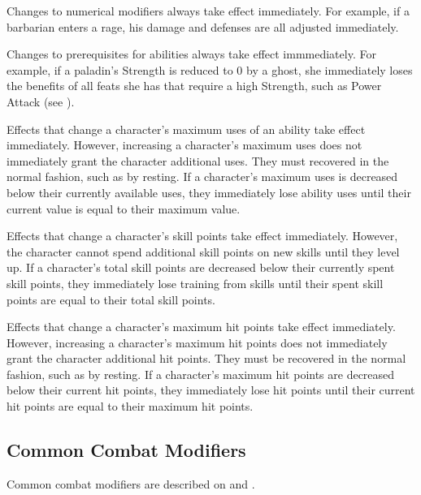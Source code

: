          Changes to numerical modifiers always take effect immediately.
        For example, if a barbarian enters a rage, his damage and defenses are all adjusted immediately.

         Changes to prerequisites for abilities always take effect immmediately.
        For example, if a paladin's Strength is reduced to 0 by a ghost, she immediately loses the benefits of all feats she has that require a high Strength, such as Power Attack (see ).

         Effects that change a character's maximum uses of an ability take effect immediately.
        However, increasing a character's maximum uses does not immediately grant the character additional uses.
        They must recovered in the normal fashion, such as by resting.
        If a character's maximum uses is decreased below their currently available uses, they immediately lose ability uses until their current value is equal to their maximum value.

         Effects that change a character's skill points take effect immediately.
        However, the character cannot spend additional skill points on new skills until they level up.
        If a character's total skill points are decreased below their currently spent skill points, they immediately lose training from skills until their spent skill points are equal to their total skill points.

         Effects that change a character's maximum hit points take effect immediately.
        However, increasing a character's maximum hit points does not immediately grant the character additional hit points.
        They must be recovered in the normal fashion, such as by resting.
        If a character's maximum hit points are decreased below their current hit points, they immediately lose hit points until their current hit points are equal to their maximum hit points.

    \subsection{Common Combat Modifiers}

        Common combat modifiers are described on  and .

